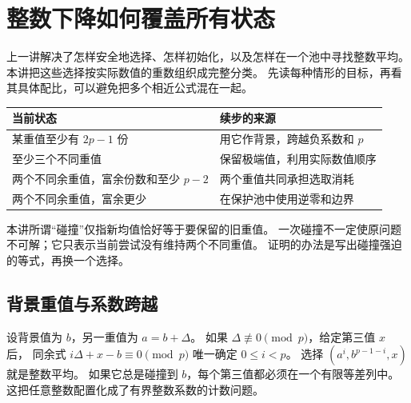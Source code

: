 \chapter{整数下降如何覆盖所有状态}\label{ch:descent-finish}

上一讲解决了怎样安全地选择、怎样初始化，以及怎样在一个池中寻找整数平均。
本讲把这些选择按实际数值的重数组织成完整分类。
先读每种情形的目标，再看其具体配比，可以避免把多个相近公式混在一起。

\begin{center}
\begin{tabular}{p{}p{}}
\toprule 当前状态 & 续步的来源\\\midrule
某重值至少有 $2p-1$ 份 & 用它作背景，跨越负系数和 $p$\\
至少三个不同重值 & 保留极端值，利用实际数值顺序\\
两个不同余重值，富余份数和至少 $p-2$ & 两个重值共同承担选取消耗\\
两个不同余重值，富余更少 & 在保护池中使用逆零和边界\\
\bottomrule
\end{tabular}
\end{center}
本讲所谓“碰撞”仅指新均值恰好等于要保留的旧重值。
一次碰撞不一定使原问题不可解；它只表示当前尝试没有维持两个不同重值。
证明的办法是写出碰撞强迫的等式，再换一个选择。

\section{背景重值与系数跨越}


设背景值为 $b$，另一重值为 $a=b+\Delta$。
如果 $\Delta\not\equiv0\pmod p$，给定第三值 $x$ 后，
同余式 $i\Delta+x-b\equiv0\pmod p$ 唯一确定 $0\le i<p$。
选择 $(a^i,b^{p-1-i},x)$ 就是整数平均。
如果它总是碰撞到 $b$，每个第三值都必须在一个有限等差列中。
这把任意整数配置化成了有界整数系数的计数问题。

